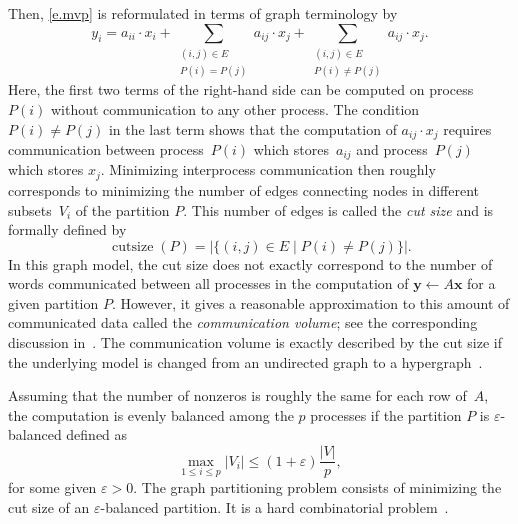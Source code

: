 \documentclass[12pt, twoside]{book}
\newcommand{\mat}[1]{\ensuremath{#1}}
\newcommand{\vek}[1]{{\ensuremath{\mathbf #1}}}
\begin{document}
Then, \eqref{e.mvp} is reformulated in terms of graph terminology by
\begin{displaymath}
y_i = a_{ii} \cdot x_i +
\sum_{ \substack{(i,j)\in E \\ P(i)=P(j)}} a_{ij} \cdot x_j
+ \sum_{ \substack{(i,j)\in E \\ P(i)\neq P(j)}} a_{ij} \cdot x_j .
\end{displaymath}
Here, the first two terms of the right-hand side can be computed on process~$P(i)$
without communication to any other process. The condition~$P(i)\neq P(j)$ in the last
term shows that the computation of $a_{ij} \cdot x_j$ requires communication between
process~$P(i)$ which stores~$a_{ij}$ and process~$P(j)$ which stores $x_j$. Minimizing
interprocess communication then roughly corresponds to minimizing the number of edges
connecting nodes in different subsets~$V_i$ of the partition $P$. This number of edges is
called the \emph{cut size} and is formally defined by
\begin{equation}\label{e.cut}
\operatorname{cutsize}(P) = \bigl| \{ (i,j) \in E \mid P(i)\neq P(j) \} \bigr|.
\end{equation}
In this graph model, the cut size does not exactly correspond to the number of words
communicated between all processes in the computation of $\vek{y} \leftarrow \mat{A}
\vek{x}$ for a given partition $P$. However, it gives a reasonable approximation to this
amount of communicated data called the \emph{communication volume}; see the corresponding
discussion in~\cite{hk:mod}. The communication volume is exactly described by the cut
size if the underlying model is changed from an undirected graph to a
hypergraph~\cite{ca:hyp,cua:hyp,ua:rev}.

Assuming that the number of nonzeros is roughly the same for each row of~\mat{A}, the
computation is evenly balanced among the $p$ processes if the partition $P$ is
$\varepsilon$-balanced defined as
\begin{equation}\label{e.bal}
\max_{1 \leq i \leq p} |V_i| \leq (1 + \varepsilon) \frac{|V|}{p} ,
\end{equation}
for some given $\varepsilon > 0$. The graph partitioning problem consists of minimizing
the cut size of an $\varepsilon$-balanced partition. It is a hard combinatorial
problem~\cite{gj:com}.
\end{document}
